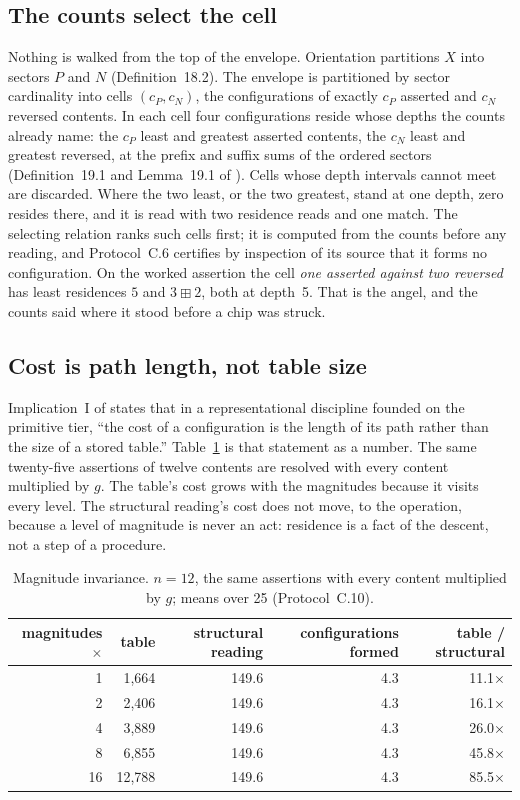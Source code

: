 \documentclass[pdflatex,sn-mathphys-num]{sn-jnl}
\theoremstyle{thmstyleone}%
\theoremstyle{thmstyletwo}%
\theoremstyle{thmstylethree}%
\newcommand{\PA}{\cite{Swanagon2026PA}}
\newcommand{\q}[1]{``#1''}        %
\begin{document}
\subsection{The counts select the cell}
Nothing is walked from the top of the envelope. Orientation partitions $X$ into sectors $P$ and $N$ (Definition~18.2). The envelope is partitioned by sector cardinality into cells $(c_P,c_N)$, the configurations of exactly $c_P$ asserted and $c_N$ reversed contents. In each cell four configurations reside whose depths the counts already name: the $c_P$ least and greatest asserted contents, the $c_N$ least and greatest reversed, at the prefix and suffix sums of the ordered sectors (Definition~19.1 and Lemma~19.1 of \PA). Cells whose depth intervals cannot meet are discarded. Where the two least, or the two greatest, stand at one depth, zero resides there, and it is read with two residence reads and one match. The selecting relation ranks such cells first; it is computed from the counts before any reading, and Protocol~C.6 certifies by inspection of its source that it forms no configuration. On the worked assertion the cell \emph{one asserted against two reversed} has least residences $5$ and $3\boxplus 2$, both at depth~5. That is the angel, and the counts said where it stood before a chip was struck.

\subsection{Cost is path length, not table size}
Implication~I of \PA{} states that in a representational discipline founded on the primitive tier, \q{the cost of a configuration is the length of its path rather than the size of a stored table.} Table~\ref{tab:magnitude} is that statement as a number. The same twenty-five assertions of twelve contents are resolved with every content multiplied by $g$. The table's cost grows with the magnitudes because it visits every level. The structural reading's cost does not move, to the operation, because a level of magnitude is never an act: residence is a fact of the descent, not a step of a procedure.

\begin{table}[!htbp]
\centering
\caption{Magnitude invariance. $n=12$, the same assertions with every content multiplied by $g$; means over 25 (Protocol~C.10).}
\label{tab:magnitude}
\begin{tabular}{rrrrr}
\toprule
magnitudes $\times$ & table & structural reading & configurations formed & table / structural \\
\midrule
1 & 1,664 & 149.6 & 4.3 & 11.1$\times$ \\
2 & 2,406 & 149.6 & 4.3 & 16.1$\times$ \\
4 & 3,889 & 149.6 & 4.3 & 26.0$\times$ \\
8 & 6,855 & 149.6 & 4.3 & 45.8$\times$ \\
16 & 12,788 & 149.6 & 4.3 & 85.5$\times$ \\
\bottomrule
\end{tabular}
\end{table}
\end{document}
